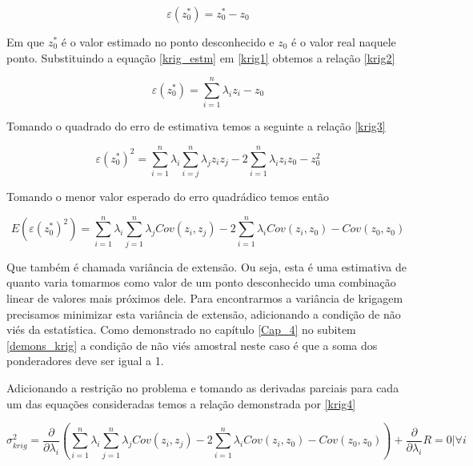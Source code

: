 \begin{equation}\label{krig1}
\varepsilon (z^{*}_{0}) = z^{*}_{0} -z_{0} 
\end{equation}

Em que $z^{*}_{0}$ é o valor estimado no ponto desconhecido e $z_{0}$ é o valor real naquele ponto. Substituindo a equação \eqref{krig_estm} em \eqref{krig1} obtemos a relação \eqref{krig2}

\begin{equation}\label{krig2}
\varepsilon (z^{*}_{0}) = \sum_{i=1}^{n} \lambda_{i} z_{i}  -z_{0} 
\end{equation}

Tomando o quadrado do erro de estimativa temos a seguinte a relação \eqref{krig3}

\begin{equation}\label{krig3}
\varepsilon (z^{*}_{0})^2 = \sum_{i=1}^{n} \lambda_{i} \sum_{i=j}^{n} \lambda_{j}z_{i}z_{j} -2\sum_{i=1}^{n} \lambda_{i}z_{i}z_{0} -z_{0}^2 
\end{equation}

Tomando o menor valor esperado do erro quadrádico temos então 

\begin{equation}\label{krig4}
E\left(\varepsilon (z^{*}_{0})^2\right) = \sum_{i=1}^{n} \lambda_{i} \sum_{j=1}^{n} \lambda_{j}Cov(z_{i},z_{j}) -2\sum_{i=1}^{n} \lambda_{i}Cov(z_{i},z_{0}) -Cov(z_{0},z_{0}) 
\end{equation}

Que também é chamada variância de extensão. Ou seja, esta é uma estimativa de quanto varia tomarmos como valor de um ponto desconhecido uma combinação linear de valores mais próximos dele. Para encontrarmos a variância de krigagem precisamos minimizar esta variância de extensão, adicionando a condição de não viés da estatística. Como demonstrado no capítulo \ref{Cap_4} no subitem \ref{demons_krig} a condição de não viés amostral neste caso é que a soma dos ponderadores deve ser igual a 1.

Adicionando a restrição no problema e tomando as derivadas parciais para cada um das equações consideradas temos a relação demonstrada por \eqref{krig4} 

\begin{equation}\label{krig5}
\sigma ^2_{krig} = \frac{\partial }{\partial \lambda _{i}} \left( \sum_{i=1}^{n} \lambda_{i} \sum_{j=1}^{n} \lambda_{j}Cov(z_{i},z_{j}) -2\sum_{i=1}^{n} \lambda_{i}Cov(z_{i},z_{0}) -Cov(z_{0},z_{0}) \right ) + \frac{\partial }{\partial \lambda _{i}} R = 0 | \forall i
\end{equation}

